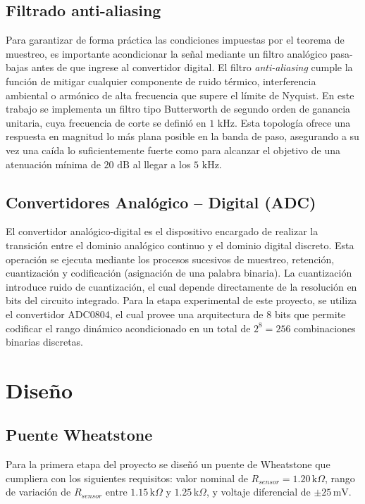 \documentclass[journal, onecolumn]{IEEEtran}
\begin{document}
\subsection{Filtrado anti-aliasing}
Para garantizar de forma práctica las condiciones impuestas por el teorema de muestreo, es importante acondicionar la señal mediante un filtro analógico pasa-bajas antes de que ingrese al convertidor digital. El filtro \textit{anti-aliasing} cumple la función de mitigar cualquier componente de ruido térmico, interferencia ambiental o armónico de alta frecuencia que supere el límite de Nyquist. En este trabajo se implementa un filtro tipo Butterworth de segundo orden de ganancia unitaria, cuya frecuencia de corte se definió en $1\text{ kHz}$. Esta topología ofrece una respuesta en magnitud lo más plana posible en la banda de paso, asegurando a su vez una caída lo suficientemente fuerte como para alcanzar el objetivo de una atenuación mínima de $20\text{ dB}$ al llegar a los $5\text{ kHz}$.

\subsection{Convertidores Analógico – Digital (ADC)}
El convertidor analógico-digital es el dispositivo encargado de realizar la transición entre el dominio analógico continuo y el dominio digital discreto. Esta operación se ejecuta mediante los procesos sucesivos de muestreo, retención, cuantización y codificación (asignación de una palabra binaria). La cuantización introduce ruido de cuantización, el cual depende directamente de la resolución en bits del circuito integrado. Para la etapa experimental de este proyecto, se utiliza el convertidor ADC0804, el cual provee una arquitectura de 8 bits que permite codificar el rango dinámico acondicionado en un total de $2^8 = 256$ combinaciones binarias discretas.

\section{Diseño}

\subsection{Puente Wheatstone}

Para la primera etapa del proyecto se diseñó un puente de Wheatstone que cumpliera con los siguientes requisitos: valor nominal de $R_{sensor} = 1.20\,\text{k}\Omega$, rango de variación de $R_{sensor}$ entre $1.15\,\text{k}\Omega$ y $1.25\,\text{k}\Omega$, y voltaje diferencial de $\pm 25\,\text{mV}$.
\end{document}
